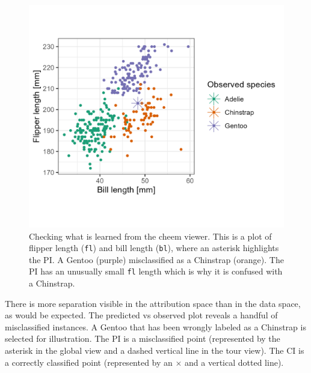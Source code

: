 \documentclass[11pt,twoside]{article}
\begin{document}
\begin{figure}

{\centering \includegraphics[width=1\linewidth]{./figures/case_penguins_BlFl} 

}

\caption{Checking what is learned from the cheem viewer. This is a plot of flipper length (\texttt{fl}) and bill length (\texttt{bl}), where an asterisk highlights the PI. A Gentoo (purple) misclassified as a Chinstrap (orange). The PI has an unusually small \texttt{fl} length which is why it is confused with a Chinstrap.}\label{fig:casepenguinsblfl}
\end{figure}

There is more separation visible in the attribution space than in the data space, as would be expected. The predicted vs observed plot reveals a handful of misclassified instances. A Gentoo that has been wrongly labeled as a Chinstrap is selected for illustration. The PI is a misclassified point (represented by the asterisk in the global view and a dashed vertical line in the tour view). The CI is a correctly classified point (represented by an \(\times\) and a vertical dotted line).
\end{document}
